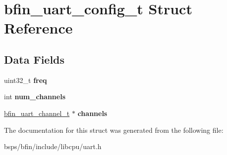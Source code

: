 \hypertarget{structbfin__uart__config__t}{}\section{bfin\+\_\+uart\+\_\+config\+\_\+t Struct Reference}
\label{structbfin__uart__config__t}
\subsection*{Data Fields}
\begin{DoxyCompactItemize}
\item 
\mbox{\label{structbfin__uart__config__t_a9217163ffc34904315f4ad49e40b02d4}} 
uint32\+\_\+t {\bfseries freq}
\item 
\mbox{\label{structbfin__uart__config__t_a214bb628bca92e0f0ee9910ed8850323}} 
int {\bfseries num\+\_\+channels}
\item 
\mbox{\label{structbfin__uart__config__t_a61fd4b412fa66f096781ddcdaebd60fe}} 
\mbox{\hyperlink{structbfin__uart__channel__t}{bfin\+\_\+uart\+\_\+channel\+\_\+t}} $\ast$ {\bfseries channels}
\end{DoxyCompactItemize}


The documentation for this struct was generated from the following file\+:\begin{DoxyCompactItemize}
\item 
bsps/bfin/include/libcpu/uart.\+h\end{DoxyCompactItemize}
